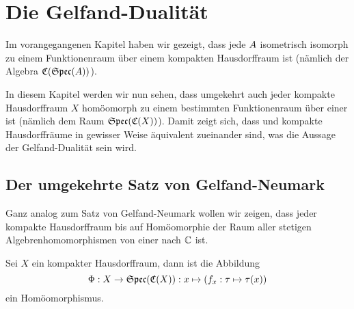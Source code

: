 \section{Die Gelfand-Dualität}\label{sec:GD}

Im vorangegangenen Kapitel haben wir gezeigt, dass jede \CAlg{} $A$ isometrisch isomorph zu einem Funktionenraum über einem kompakten Hausdorffraum ist (nämlich der Algebra $\mathfrak{C}(\mathfrak{Spec}(A))$). 

In diesem Kapitel werden wir nun sehen, dass umgekehrt auch jeder kompakte Hausdorffraum $X$ homöomorph zu einem bestimmten Funktionenraum über  einer \CAlg{} ist (nämlich dem Raum $\mathfrak{Spec}(\mathfrak{C}(X))$). Damit zeigt sich, dass \CAlgn{} und kompakte Hausdorffräume in gewisser Weise äquivalent zueinander sind, was die Aussage der Gelfand-Dualität sein wird.

\subsection{Der \glqq umgekehrte\grqq{} Satz von Gelfand-Neumark}

Ganz analog zum Satz von Gelfand-Neumark wollen wir zeigen, dass jeder kompakte Hausdorffraum bis auf Homöomorphie der Raum aller stetigen Algebrenhomomorphismen von einer \CAlg{} nach $\mathbb{C}$ ist.

\begin{lemma}\label{lemma:NG}
Sei $X$ ein kompakter Hausdorffraum, dann ist die Abbildung
	\[\Phi: X \to \mathfrak{Spec}(\mathfrak{C}(X)): x \mapsto (f_x: \tau \mapsto \tau(x))\]
ein Homöomorphismus.
\end{lemma}

